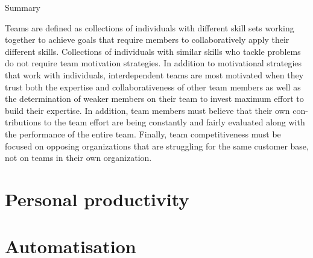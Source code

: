 Summary

Teams are defined as collections of individuals with different skill sets working together to achieve goals that require members to collaboratively apply their different skills. Collections of individuals with similar skills who tackle problems do not require team motivation strategies. In addition to motivational strategies that work with individuals, interdependent teams are most motivated when they trust both the expertise and collaborativeness of other team members as well as the determination of weaker members on their team to invest maximum effort to build their expertise. In addition, team members must believe that their own con- tributions to the team effort are being constantly and fairly evaluated along with the performance of the entire team. Finally, team competitiveness must be focused on opposing organizations that are struggling for the same customer base, not on teams in their own organization.

\section{Personal productivity}

\section{Automatisation}